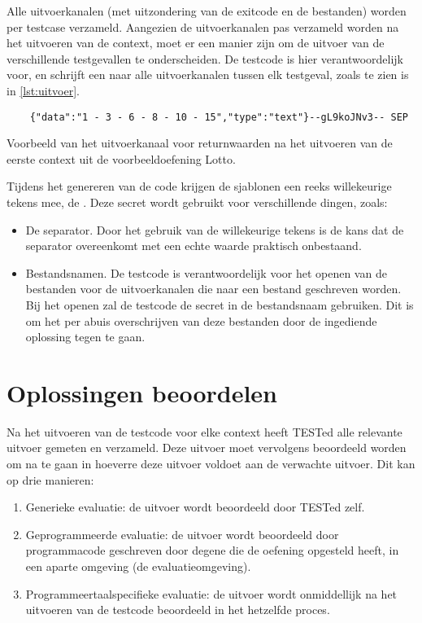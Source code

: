 Alle uitvoerkanalen (met uitzondering van de exitcode en de bestanden) worden per testcase verzameld.
Aangezien de uitvoerkanalen pas verzameld worden na het uitvoeren van de context, moet er een manier zijn om de uitvoer van de verschillende testgevallen te onderscheiden.
De testcode is hier verantwoordelijk voor, en schrijft een  naar alle uitvoerkanalen tussen elk testgeval, zoals te zien is in \cref{lst:uitvoer}.

\begin{listing}
    \begin{verbatim}
    {"data":"1 - 3 - 6 - 8 - 10 - 15","type":"text"}--gL9koJNv3-- SEP
    \end{verbatim}
    \caption{Voorbeeld van het uitvoerkanaal voor returnwaarden na het uitvoeren van de eerste context uit de voorbeeldoefening Lotto.}
    \label{lst:uitvoer}
\end{listing}

Tijdens het genereren van de code krijgen de sjablonen een reeks willekeurige tekens mee, de .
Deze secret wordt gebruikt voor verschillende dingen, zoals:
\begin{itemize}
    \item De separator.
    Door het gebruik van de willekeurige tekens is de kans dat de separator overeenkomt met een echte waarde praktisch onbestaand.
    \item Bestandsnamen.
    De testcode is verantwoordelijk voor het openen van de bestanden voor de uitvoerkanalen die naar een bestand geschreven worden.
    Bij het openen zal de testcode de secret in de bestandsnaam gebruiken.
    Dit is om het per abuis overschrijven van deze bestanden door de ingediende oplossing tegen te gaan.
\end{itemize}

\section{Oplossingen beoordelen}\label{sec:oplossingen-beoordelen}

Na het uitvoeren van de testcode voor elke context heeft TESTed alle relevante uitvoer gemeten en verzameld.
Deze uitvoer moet vervolgens beoordeeld worden om na te gaan in hoeverre deze uitvoer voldoet aan de verwachte uitvoer.
Dit kan op drie manieren:
\begin{enumerate}
    \item Generieke evaluatie: de uitvoer wordt beoordeeld door TESTed zelf.
    \item Geprogrammeerde evaluatie: de uitvoer wordt beoordeeld door programmacode geschreven door degene die de oefening opgesteld heeft, in een aparte omgeving (de evaluatieomgeving).
    \item Programmeertaalspecifieke evaluatie: de uitvoer wordt onmiddellijk na het uitvoeren van de testcode beoordeeld in het hetzelfde proces.
\end{enumerate}

